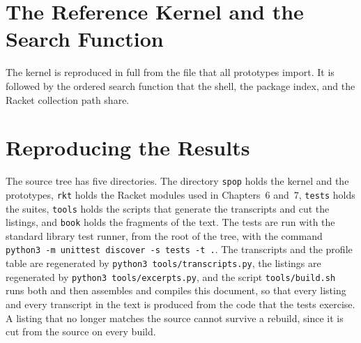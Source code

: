 \documentclass[11pt,oneside]{report}
\theoremstyle{plain}
\theoremstyle{definition}
\theoremstyle{remark}
\begin{document}
\chapter{The Reference Kernel and the Search Function}

The kernel is reproduced in full from the file that all prototypes import. It is followed by the ordered search function that the shell, the package index, and the Racket collection path share.





\chapter{Reproducing the Results}

The source tree has five directories. The directory \texttt{spop} holds the kernel and the prototypes, \texttt{rkt} holds the Racket modules used in Chapters~6 and~7, \texttt{tests} holds the suites, \texttt{tools} holds the scripts that generate the transcripts and cut the listings, and \texttt{book} holds the fragments of the text. The tests are run with the standard library test runner, from the root of the tree, with the command \texttt{python3 -m unittest discover -s tests -t .}. The transcripts and the profile table are regenerated by \texttt{python3 tools/transcripts.py}, the listings are regenerated by \texttt{python3 tools/excerpts.py}, and the script \texttt{tools/build.sh} runs both and then assembles and compiles this document, so that every listing and every transcript in the text is produced from the code that the tests exercise. A listing that no longer matches the source cannot survive a rebuild, since it is cut from the source on every build.
\end{document}
